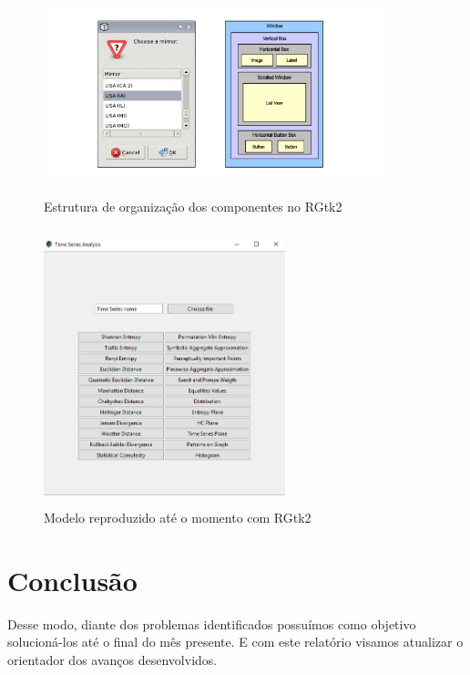 \documentclass[12pt,letterpaper]{article}
\begin{document}
\begin{figure}
  \centering
  \caption{Estrutura de organização dos componentes no RGtk2}
   \includegraphics[width=10cm,height=6cm]{estruturaRgtk2.png}
\end{figure}

\begin{figure}
  \centering
  \caption{Modelo reproduzido até o momento com RGtk2}
   \includegraphics[width=7cm,height=8cm]{modeloRGtk2.png}
\end{figure}

\section{Conclusão}

Desse modo, diante dos problemas identificados possuímos como objetivo solucioná-los até o final do mês presente. E com este relatório visamos atualizar o orientador dos avanços desenvolvidos.


\printbibliography[title=Referências]
\end{document}
